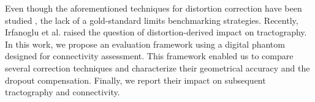 Even though the aforementioned techniques for distortion correction have been studied
  \cite{zeng_image_2002,wu_comparison_2008}, the lack of a gold-standard limits benchmarking
  strategies.
Recently, Irfanoglu et al. \cite{irfanoglu_effects_2012} raised the question of distortion-derived
  impact on tractography.
In this work, we propose an evaluation framework using a digital phantom designed for connectivity
  assessment.
This framework enabled us to compare several correction techniques and characterize their geometrical
  accuracy and the dropout compensation.
Finally, we report their impact on subsequent tractography and connectivity.